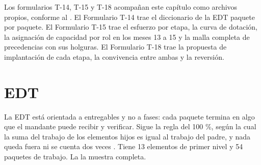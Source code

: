 Los formularios T-14, T-15 y T-18 acompañan este capítulo como archivos propios, conforme al
. El Formulario T-14 trae el diccionario de la EDT paquete por paquete. El
Formulario T-15 trae el esfuerzo por etapa, la curva de dotación, la asignación de capacidad por rol en
los meses 13 a 15 y la malla completa de precedencias con sus holguras. El Formulario T-18 trae la
propuesta de implantación de cada etapa, la convivencia entre ambas y la reversión.

\section{EDT}\label{sec:7-edt}

La EDT está orientada a entregables y no a fases: cada paquete termina en algo que el mandante puede
recibir y verificar. Sigue la regla del 100 \%, según la cual la suma del trabajo de los elementos
hijos es igual al trabajo del padre, y nada queda fuera ni se cuenta dos veces
\parencite{pmi2019_wbs}. Tiene 13 elementos de primer nivel y 54 paquetes de trabajo. La
 la muestra completa.

